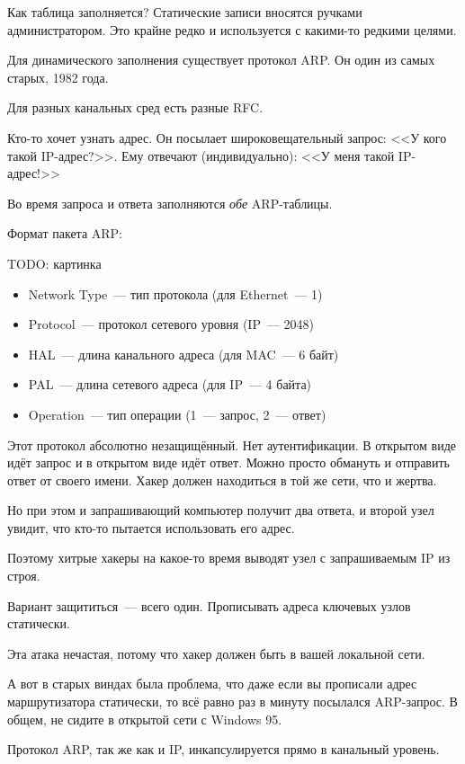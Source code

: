 Как таблица заполняется? Статические записи вносятся ручками администратором. Это крайне редко и используется с какими-то редкими целями.


Для динамического заполнения существует протокол ARP. Он один из самых старых, 1982 года. 

Для разных канальных сред есть разные RFC.

Кто-то хочет узнать адрес. Он посылает широковещательный запрос: <<У кого такой IP-адрес?>>. Ему отвечают (индивидуально): <<У меня такой IP-адрес!>>

Во время запроса и ответа заполняются {\it обе} ARP-таблицы.

Формат пакета ARP:

TODO: картинка

\begin{itemize}
    \item Network Type~--- тип протокола (для Ethernet~--- 1)
    \item Protocol~--- протокол сетевого уровня (IP~--- 2048)
    \item HAL~--- длина канального адреса (для MAC~--- 6 байт)
    \item PAL~--- длина сетевого адреса (для IP~--- 4 байта)
    \item Operation~--- тип операции (1~--- запрос, 2~--- ответ)
\end{itemize}

Этот протокол абсолютно незащищённый. Нет аутентификации. В открытом виде идёт запрос и в открытом виде идёт ответ. Можно просто обмануть и отправить ответ от своего имени. Хакер должен находиться в той же сети, что и жертва. 

Но при этом и запрашивающий компьютер получит два ответа, и второй узел увидит, что кто-то пытается использовать его адрес.

Поэтому хитрые хакеры на какое-то время выводят узел с запрашиваемым IP из строя.

Вариант защититься~--- всего один. Прописывать адреса ключевых узлов статически.

Эта атака нечастая, потому что хакер должен быть в вашей локальной сети.

А вот в старых виндах была проблема, что даже если вы прописали адрес маршрутизатора статически, то всё равно раз в минуту посылался ARP-запрос. В общем, не сидите в открытой сети с Windows 95.

Протокол ARP, так же как и IP, инкапсулируется прямо в канальный уровень.

